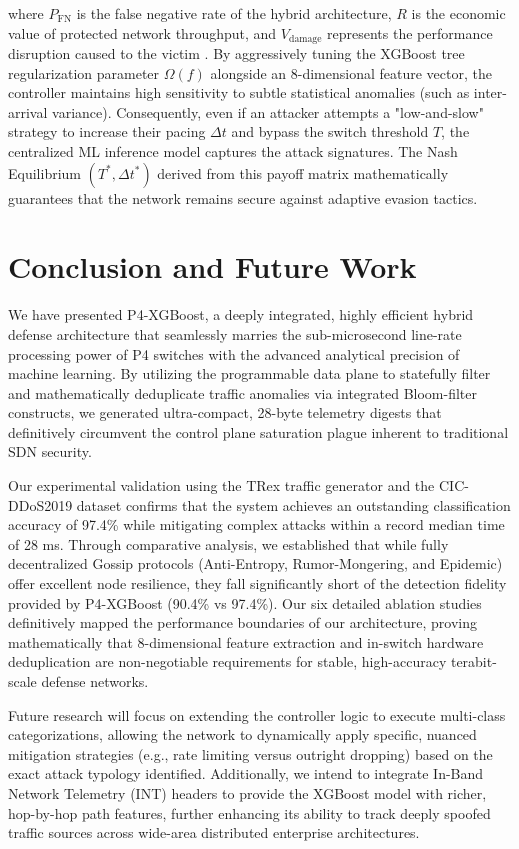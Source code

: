 \documentclass[sigconf, nonacm]{acmart}
\begin{document}
\noindent where $P_{\text{FN}}$ is the false negative rate of the hybrid architecture, $R$ is the economic value of protected network throughput, and $V_{\text{damage}}$ represents the performance disruption caused to the victim . By aggressively tuning the XGBoost tree regularization parameter $\Omega(f)$ alongside an 8-dimensional feature vector, the controller maintains high sensitivity to subtle statistical anomalies (such as inter-arrival variance). Consequently, even if an attacker attempts a "low-and-slow" strategy to increase their pacing $\Delta t$ and bypass the switch threshold $T$, the centralized ML inference model captures the attack signatures. The Nash Equilibrium $(T^*, \Delta t^*)$ derived from this payoff matrix mathematically guarantees that the network remains secure against adaptive evasion tactics.

\section{Conclusion and Future Work}

We have presented P4-XGBoost, a deeply integrated, highly efficient hybrid defense architecture that seamlessly marries the sub-microsecond line-rate processing power of P4 switches with the advanced analytical precision of machine learning. By utilizing the programmable data plane to statefully filter and mathematically deduplicate traffic anomalies via integrated Bloom-filter constructs, we generated ultra-compact, 28-byte telemetry digests that definitively circumvent the control plane saturation plague inherent to traditional SDN security. 

Our experimental validation using the TRex traffic generator and the CIC-DDoS2019 dataset confirms that the system achieves an outstanding classification accuracy of 97.4\% while mitigating complex attacks within a record median time of 28 ms. Through comparative analysis, we established that while fully decentralized Gossip protocols (Anti-Entropy, Rumor-Mongering, and Epidemic) offer excellent node resilience, they fall significantly short of the detection fidelity provided by P4-XGBoost (90.4\% vs 97.4\%). Our six detailed ablation studies definitively mapped the performance boundaries of our architecture, proving mathematically that 8-dimensional feature extraction and in-switch hardware deduplication are non-negotiable requirements for stable, high-accuracy terabit-scale defense networks.

Future research will focus on extending the controller logic to execute multi-class categorizations, allowing the network to dynamically apply specific, nuanced mitigation strategies (e.g., rate limiting versus outright dropping) based on the exact attack typology identified. Additionally, we intend to integrate In-Band Network Telemetry (INT) headers to provide the XGBoost model with richer, hop-by-hop path features, further enhancing its ability to track deeply spoofed traffic sources across wide-area distributed enterprise architectures.
\end{document}
